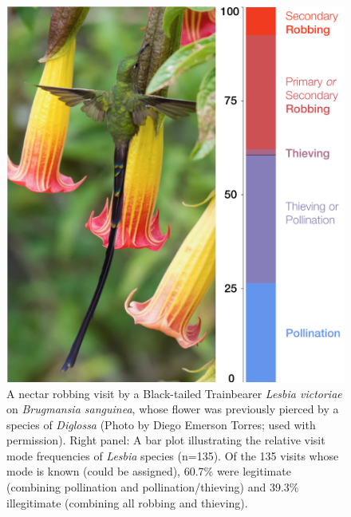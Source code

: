 \documentclass[fleqn,10pt,lineno]{wlpeerj}
\begin{document}
\begin{figure}[ht]
\centering
\includegraphics[width=1\textwidth]{fig1/marauding_lesbias_fig_1b.pdf}
\caption{A nectar robbing visit by a Black-tailed Trainbearer \textit{Lesbia victoriae} on \textit{Brugmansia sanguinea}, whose flower was previously pierced by a species of \textit{Diglossa} (Photo by Diego Emerson Torres; used with permission). Right panel: A bar plot illustrating the relative visit mode frequencies of \textit{Lesbia} species (n=135). Of the 135 visits whose mode is known (could be assigned), 60.7\% were legitimate (combining pollination and pollination/thieving) and 39.3\% illegitimate (combining all robbing and thieving).}
\label{fig:fig1}
\end{figure}

\pagebreak

\end{document}

